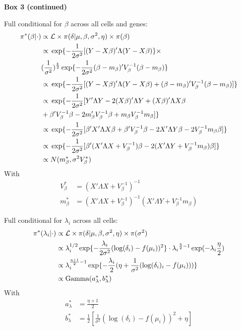 \newpage

\begin{Comment}
\textbf{Box 3 (continued)}

Full conditional for $\beta$ across all cells and genes:
\begin{align*}
\pi^*(\beta|\cdot)&\propto{} \mathcal{L}\times\pi(\delta|\mu,\beta,\sigma^2,\eta)\times\pi(\beta)\\
&\propto{}\exp\lbrace-\frac{1}{2\sigma^2}[(Y-X\beta)'\Lambda(Y-X\beta)\rbrace\times\\
&(\frac{1}{\sigma^2})^{\frac{k}{2}}\exp\lbrace-\frac{1}{2\sigma^2}(\beta-m_\beta)'V_\beta^{-1}(\beta-m_\beta)\rbrace\\
&\propto{}\exp\lbrace-\frac{1}{2\sigma^2}[(Y-X\beta)'\Lambda(Y-X\beta)+(\beta-m_\beta)'V_\beta^{-1}(\beta-m_\beta)]\rbrace\\
&\propto{}\exp\lbrace-\frac{1}{2\sigma^2}[Y'\Lambda{}Y-2(X\beta)'\Lambda{}Y+(X\beta)'\Lambda{}X\beta\\
&+\beta'V_\beta^{-1}\beta-2m_\beta'V_\beta^{-1}\beta+m_\beta{}V_\beta^{-1}m_\beta{}]\rbrace\\
&\propto{}\exp\lbrace-\frac{1}{2\sigma^2}[\beta'X'\Lambda{}X\beta+\beta'V_\beta^{-1}\beta-2X'\Lambda{}Y\beta-2V_\beta^{-1}m_\beta\beta]\rbrace\\
&\propto{}\exp\lbrace-\frac{1}{2\sigma^2}[\beta'(X'\Lambda{}X+V_\beta^{-1})\beta-2(X'\Lambda{}Y+V_\beta^{-1}m_\beta)\beta]\rbrace\\
&\propto{}N(m^*_\beta,\sigma^2V^*_\beta)
\end{align*} With
\begin{align*}
V^*_\beta&=(X'\Lambda{}X+V_\beta^{-1})^{-1}\\
m^*_\beta&=(X'\Lambda{}X+V_\beta^{-1})^{-1}(X'\Lambda{}Y+V_\beta^{-1}m_\beta{})
\end{align*}

Full conditional for $\lambda_i$ across all cells:
\begin{align*}
\pi^*(\lambda_i|\cdot)&\propto{}\mathcal{L}\times\pi(\delta|\mu,\beta,\sigma^2,\eta)\times\pi(\sigma^2)\\
&\propto{}\lambda_i^{1/2}\exp\lbrace-\frac{\lambda_i}{2\sigma^2}(\log(\delta_i)-f(\mu_i))^2\rbrace\cdot\lambda_i{}^{\frac{\eta}{2}-1}\exp(-\lambda_i{}\frac{\eta}{2})\\
&\propto{}\lambda_i^{\frac{\eta+1}{2}-1}\exp\lbrace-\frac{\lambda_i}{2}(\eta+\frac{1}{\sigma^2}(\log(\delta_i)_i-f(\mu_i)))\rbrace\\
&\propto{}\textnormal{Gamma}(a^*_\lambda,b^*_\lambda)
\end{align*}
With
\begin{align*}
a^*_\lambda&=\frac{\eta+1}{2}\\
b^*_\lambda&=\frac{1}{2}\left[\frac{1}{\sigma^2}(\log(\delta_i)-f(\mu_i))^2+\eta\right]
\end{align*}

\end{Comment}

